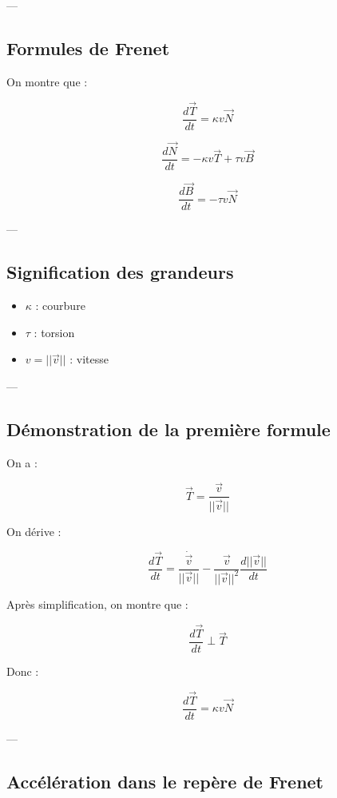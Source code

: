 \documentclass[11pt,a4paper]{article}
\begin{document}
---

\subsection{Formules de Frenet}

On montre que :

\[
\boxed{
\frac{d\vec{T}}{dt} = \kappa v \vec{N}
}
\]

\[
\boxed{
\frac{d\vec{N}}{dt} = -\kappa v \vec{T} + \tau v \vec{B}
}
\]

\[
\boxed{
\frac{d\vec{B}}{dt} = -\tau v \vec{N}
}
\]

---

\subsection{Signification des grandeurs}

\begin{itemize}
\item $\kappa$ : courbure
\item $\tau$ : torsion
\item $v = ||\vec{v}||$ : vitesse
\end{itemize}

---

\subsection{Démonstration de la première formule}

On a :

\[
\vec{T} = \frac{\vec{v}}{||\vec{v}||}
\]

On dérive :

\[
\frac{d\vec{T}}{dt}
=
\frac{\dot{\vec{v}}}{||\vec{v}||}
-
\frac{\vec{v}}{||\vec{v}||^2} \frac{d||\vec{v}||}{dt}
\]

Après simplification, on montre que :

\[
\frac{d\vec{T}}{dt} \perp \vec{T}
\]

Donc :

\[
\frac{d\vec{T}}{dt} = \kappa v \vec{N}
\]

---

\subsection{Accélération dans le repère de Frenet}
\end{document}
